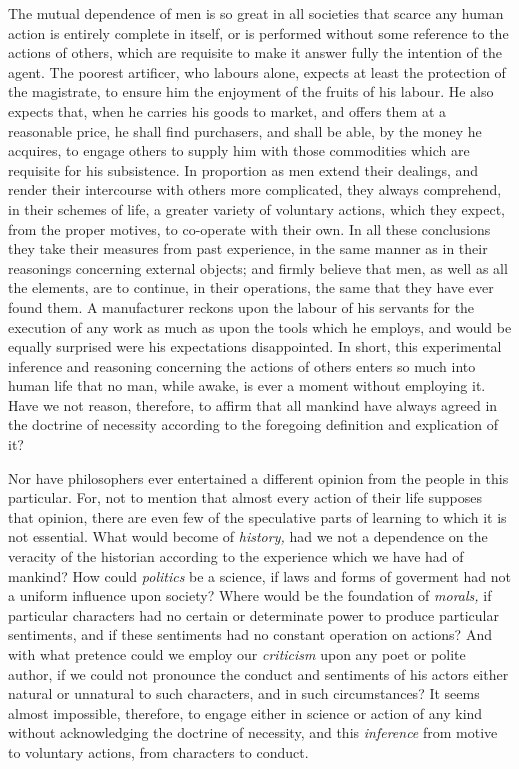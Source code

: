 \documentclass[]{article}
\begin{document}
\begin{sectionbody}
\humeparagraph  The mutual dependence of men is so great in all societies that scarce any human action is entirely complete in itself, or is performed without some reference to the actions of others, which are requisite to make it answer fully the intention of the agent. The poorest artificer, who labours alone, expects at least the protection of the magistrate, to ensure him the enjoyment of the fruits of his labour. He also expects that, when he carries his goods to market, and offers them at a reasonable price, he shall find purchasers, and shall be able, by the money he acquires, to engage others to supply him with those commodities which are requisite for his subsistence. In proportion as men extend their dealings, and render their intercourse with others more complicated, they always comprehend, in their schemes of life, a greater variety of voluntary actions, which they expect, from the proper motives, to co-operate with their own. In all these conclusions they take their measures from past experience, in the same manner as in their reasonings concerning external objects; and firmly believe that men, as well as all the elements, are to continue, in their operations, the same that they have ever found them. A manufacturer reckons upon the labour of his servants for the execution of any work as much as upon the tools which he employs, and would be equally surprised were his expectations disappointed. In short, this experimental inference and reasoning concerning the actions of others enters so much into human life that no man, while awake, is ever a moment without employing it. Have we not reason, therefore, to affirm that all mankind have always agreed in the doctrine of necessity according to the foregoing definition and explication of it?

\humeparagraph  Nor have philosophers ever entertained a different opinion from the people in this particular. For, not to mention that almost every action of their life supposes that opinion, there are even few of the speculative parts of learning to which it is not essential. What would become of \emph{history,} had we not a dependence on the veracity of the historian according to the experience which we have had of mankind? How could \emph{politics} be a science, if laws and forms of goverment had not a uniform influence upon society? Where would be the foundation of \emph{morals,} if particular characters had no certain or determinate power to produce particular sentiments, and if these sentiments had no constant operation on actions? And with what pretence could we employ our \emph{criticism} upon any poet or polite author, if we could not pronounce the conduct and sentiments of his actors either natural or unnatural to such characters, and in such circumstances? It seems almost impossible, therefore, to engage either in science or action of any kind without acknowledging the doctrine of necessity, and this \emph{inference} from motive to voluntary actions, from characters to conduct.


\end{sectionbody}
\end{document}
